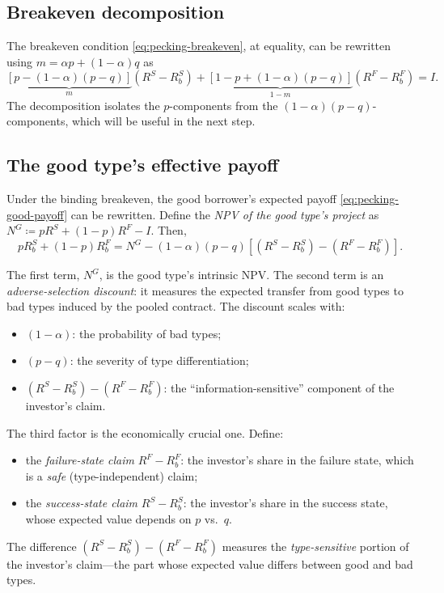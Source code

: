\documentclass[11pt,a4paper,oneside]{book}
\theoremstyle{plain}
\theoremstyle{definition}
\theoremstyle{remark}
\numberwithin{equation}{chapter}
\begin{document}
\subsection{Breakeven decomposition}

The breakeven condition \eqref{eq:pecking-breakeven}, at equality, can be rewritten using $m = \alpha p + (1-\alpha) q$ as
\begin{equation}\label{eq:pecking-breakeven-decomp}
  \underbrace{[p - (1-\alpha)(p-q)]}_{m}(R^S - R_b^S) + \underbrace{[1 - p + (1-\alpha)(p-q)]}_{1-m}(R^F - R_b^F) = I.
\end{equation}
The decomposition isolates the $p$-components from the $(1-\alpha)(p-q)$-components, which will be useful in the next step.

\subsection{The good type's effective payoff}

Under the binding breakeven, the good borrower's expected payoff \eqref{eq:pecking-good-payoff} can be rewritten.
Define the \emph{NPV of the good type's project} as $N^G \coloneqq pR^S + (1-p)R^F - I$.
Then,
\begin{equation}\label{eq:pecking-good-effective}
  p R_b^S + (1 - p) R_b^F = N^G - (1 - \alpha)(p - q)\left[(R^S - R_b^S) - (R^F - R_b^F)\right].
\end{equation}

The first term, $N^G$, is the good type's intrinsic NPV.
The second term is an \emph{adverse-selection discount}: it measures the expected transfer from good types to bad types induced by the pooled contract.
The discount scales with:
\begin{itemize}
  \item $(1 - \alpha)$: the probability of bad types;
  \item $(p - q)$: the severity of type differentiation;
  \item $(R^S - R_b^S) - (R^F - R_b^F)$: the ``information-sensitive'' component of the investor's claim.
\end{itemize}

The third factor is the economically crucial one.
Define:
\begin{itemize}
  \item the \emph{failure-state claim} $R^F - R_b^F$: the investor's share in the failure state, which is a \emph{safe} (type-independent) claim;
  \item the \emph{success-state claim} $R^S - R_b^S$: the investor's share in the success state, whose expected value depends on $p$ vs.\ $q$.
\end{itemize}
The difference $(R^S - R_b^S) - (R^F - R_b^F)$ measures the \emph{type-sensitive} portion of the investor's claim---the part whose expected value differs between good and bad types.
\end{document}
